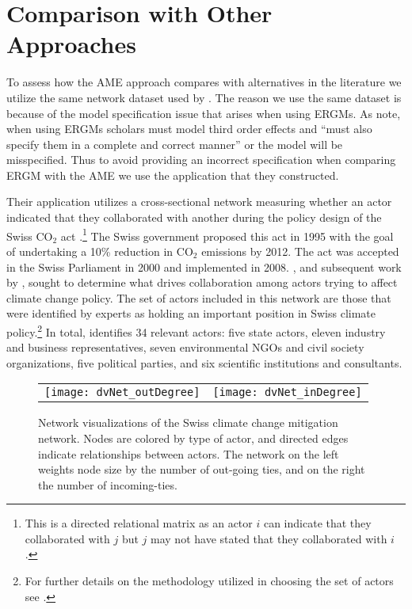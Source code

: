 \section{\textbf{Comparison with Other Approaches}}

To assess how the AME approach compares with alternatives in the literature we utilize the same network dataset used by \citet{cranmer:etal:2016}. The reason we use the same dataset is because of the model specification issue that arises when using ERGMs. As \citet[p. 8]{cranmer:etal:2016} note, when using ERGMs scholars must model third order effects and ``must also specify them in a complete and correct manner'' or the model will be misspecified. Thus to avoid providing an incorrect specification when comparing ERGM with the AME we use the application that they constructed. 

Their application utilizes a cross-sectional network measuring whether an actor indicated that they collaborated with another during the policy design of the Swiss CO$_{2}$ act \citep{ingold:2008}.\footnote{This is a directed relational matrix as an actor $i$ can indicate that they collaborated with $j$ but $j$ may not have stated that they collaborated with $i$.} The Swiss government proposed this act in 1995 with the goal of undertaking a 10\% reduction in CO$_{2}$ emissions by 2012. The act was accepted in the Swiss Parliament in 2000 and implemented in 2008. \citet{ingold:2008}, and subsequent work by \citet{ingold:fischer:2014}, sought to determine what drives collaboration among actors trying to affect climate change policy. The set of actors included in this network are those that were identified by experts as holding an important position in Swiss climate policy.\footnote{For further details on the methodology utilized in choosing the set of actors see \citet{ingold:2008,ingold:fischer:2014}.} In total, \citet{ingold:2008} identifies 34 relevant actors: five state actors, eleven industry and business representatives, seven environmental NGOs and civil society organizations, five political parties, and six scientific institutions and consultants. 

\begin{figure}[ht]
	\centering
	\begin{tabular}{cc}
	\texttt{[image: dvNet\_outDegree]} & 
	\texttt{[image: dvNet\_inDegree]}
	\end{tabular}
	\caption{Network visualizations of the Swiss climate change mitigation network. Nodes are colored by type of actor, and directed edges indicate relationships between actors. The network on the left weights node size by the number of out-going ties, and on the right the number of incoming-ties.}
	\label{fig:dvNet}
\end{figure}
\FloatBarrier

